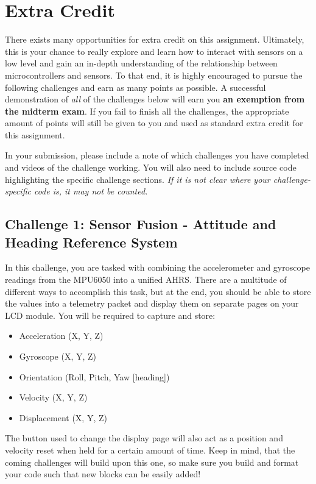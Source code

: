\section*{Extra Credit} 
There exists many opportunities for extra credit on this assignment. 
Ultimately, this is your chance to really explore and learn how to interact with sensors on a low level and gain an in-depth understanding of the relationship between microcontrollers and sensors.
To that end, it is highly encouraged to pursue the following challenges and earn as many points as possible.
A successful demonstration of \emph{all} of the challenges below will earn you \textbf{an exemption from the midterm exam}.
If you fail to finish all the challenges, the appropriate amount of points will still be given to you and used as standard extra credit for this assignment.

In your submission, please include a note of which challenges you have completed and videos of the challenge working. 
You will also need to include source code highlighting the specific challenge sections.
\emph{If it is not clear where your challenge-specific code is, it may not be counted.}

    \subsection*{Challenge 1: Sensor Fusion - Attitude and Heading Reference System}
    In this challenge, you are tasked with combining the accelerometer and gyroscope readings from the MPU6050 into a unified AHRS.
    There are a multitude of different ways to accomplish this task, but at the end, you should be able to store the values into a telemetry packet and display them on separate pages on your LCD module.
    You will be required to capture and store:

    \begin{itemize}
        \item Acceleration (X, Y, Z)
        \item Gyroscope (X, Y, Z)
        \item Orientation (Roll, Pitch, Yaw [heading])
        \item Velocity (X, Y, Z)
        \item Displacement (X, Y, Z)
    \end{itemize}

    The button used to change the display page will also act as a position and velocity reset when held for a certain amount of time.
    Keep in mind, that the coming challenges will build upon this one, so make sure you build and format your code such that new blocks can be easily added!

